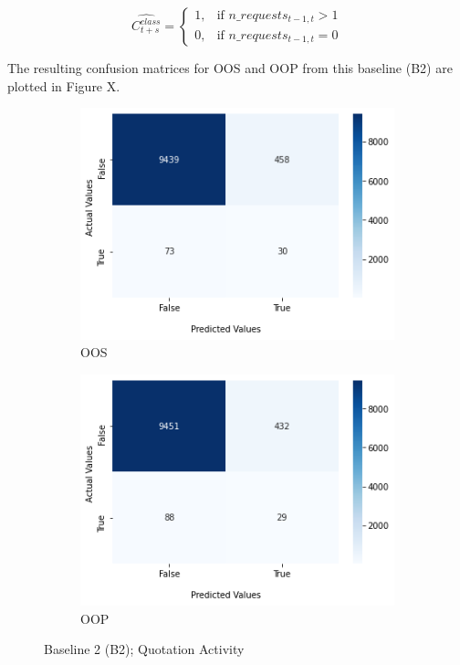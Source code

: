 \documentclass[12pt,titlepage]{article}
\begin{document}
\begin{equation} \label{b2}
    \widehat{C_{t+s}^{class}} = \begin{cases}
        1,& \text{if } n\_requests_{t - 1, t} > 1 \\
        0,& \text{if } n\_requests_{t - 1, t} = 0
    \end{cases}
\end{equation}

The resulting confusion matrices for OOS and OOP from this baseline (B2) are plotted in Figure X. \\

\begin{figure}
\centering
\begin{subfigure}{.5\textwidth}
  \centering
  \includegraphics[width=1\linewidth]{conf_b2_oos.png}
  \caption{OOS}
  \label{fig:conf_b2_oos}
\end{subfigure}%
\begin{subfigure}{.5\textwidth}
  \centering
  \includegraphics[width=1\linewidth]{conf_b2_oop.png}
  \caption{OOP}
  \label{fig:conf_b2_oop}
\end{subfigure}
\caption{Baseline 2 (B2); Quotation Activity}
\label{fig:b2}
\end{figure}
\end{document}
